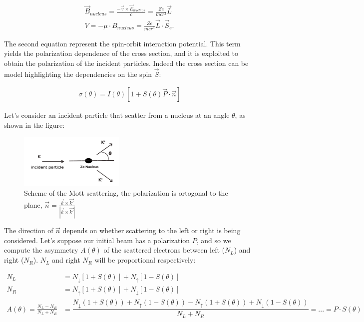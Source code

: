 \begin{align*}
\vec{B}_{nucleus} = \frac{-\vec{v} \times \vec{E}_{nucleus}}{c}  = \frac{Ze}{mc r^{3}} \vec{L} \\
V = - \mu \cdot B_{nucleus} = \frac{Ze}{mcr^{3}} \vec{L} \cdot \vec{S}_{e^{-}}
\end{align*}

The second equation represent the spin-orbit interaction potential. This term yields the polarization dependence of the cross section, and it is exploited to obtain the polarization of the incident particles. Indeed the cross section can be model highlighting the dependencies on the spin $\vec{S}$:

\begin{align*}
\sigma(\theta) = I(\theta) [1 + S(\theta) \vec{P} \cdot \vec{n} ]
\end{align*}

Let's consider an incident particle that scatter from a nucleus at an angle $\theta$, as shown in the figure:

\begin{figure}[hbtp]
\centering
\includegraphics[width = 0.45\textwidth]{ExperimentalSetup/mottFig.png}
\caption{Scheme of the Mott scattering, the polarization is ortogonal to the plane,  $ \vec{n} = \frac{\vec{k} \times \vec{k'}}{|\vec{k} \times \vec{k'}|}$}
\end{figure}

The direction of $\vec{n}$ depends on whether scattering to the left or right is being considered. Let's suppose our initial beam has a polarization $P$, and so we compute the asymmetry $A(\theta)$ of the scattered electrons between left ($N_{L}$) and right ($N_{R}$). $N_{L}$ and right $N_{R}$ will be proportional respectively:


\begin{align*}
N_{L} &= N_{\downarrow}[1 + S(\theta)] + N_{\uparrow}[1 - S(\theta)] \\
N_{R} &= N_{\uparrow}[1 + S(\theta)] + N_{\downarrow}[1 - S(\theta)]  \\
A(\theta) = \frac{N_{L} - N_{R}}{N_{L} + N_{R}} &= \dfrac{N_{\downarrow}(1 + S(\theta)) + N_{\uparrow}(1 - S(\theta)) - N_{\uparrow}(1 + S(\theta)) + N_{\downarrow}(1 - S(\theta))}{N_{L} + N_{R}} = ... = P \cdot S(\theta)
\end{align*}


